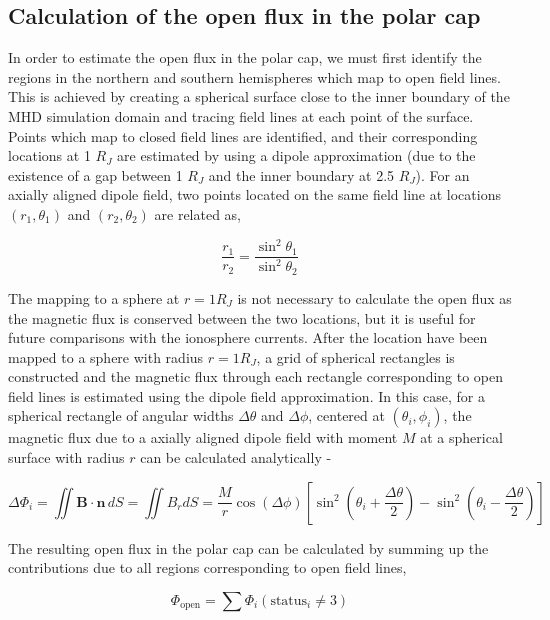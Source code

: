 \subsection{Calculation of the open flux in the polar cap}
In order to estimate the open flux in the polar cap, we must first identify the regions in the northern and southern hemispheres which map to open field lines. This is achieved by creating a spherical surface close to the inner boundary of the MHD simulation domain and tracing field lines at each point of the surface. Points which map to closed field lines are identified, and their corresponding locations at 1 $R_J$ are estimated by using a dipole approximation (due to the existence of a gap between 1 $R_J$ and the inner boundary at 2.5 $R_J$). For an axially aligned dipole field, two points located on the same field line at locations $(r_1, \theta_1)$ and $(r_2, \theta_2)$ are related as,

\begin{equation}
    \frac{r_1}{r_2} = \frac{\sin^2\theta_1}{\sin^2\theta_2}
\end{equation}

The mapping to a sphere at $r=1R_J$ is not necessary to calculate the open flux as the magnetic flux is conserved between the two locations, but it is useful for future comparisons with the ionosphere currents. After the location have been mapped to a sphere with radius $r=1 R_J$, a grid of spherical rectangles is constructed and the magnetic flux through each rectangle corresponding to open field lines is estimated using the dipole field approximation. In this case, for a spherical rectangle of angular widths $\Delta\theta$ and $\Delta\phi$, centered at $(\theta_i, \phi_i)$, the magnetic flux due to a axially aligned dipole field with moment $M$ at a spherical surface with radius $r$ can be calculated analytically - 

\begin{equation}
    \Delta \Phi_i = \iint \mathbf{B} \cdot \mathbf{n}\, dS = \iint B_r dS = \frac{M}{r} \cos(\Delta \phi) \left[ \sin^2 \left( \theta_i + \frac{\Delta\theta}{2}\right) - \sin^2 \left(\theta_i - \frac{\Delta\theta}{2} \right)\right]
\end{equation}

The resulting open flux in the polar cap can be calculated by summing up the contributions due to all regions corresponding to open field lines,

\begin{equation}
    \Phi_\text{open} = \sum \Phi_i\left( \text{status}_i \neq 3 \right)
\end{equation}

